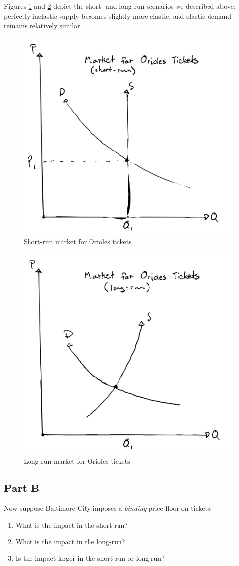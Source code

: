 \documentclass[12pt]{article}
\begin{document}
\vspace{2mm}

Figures \ref{fig:Orioles_short} and \ref{fig:Orioles_long} depict the short- and long-run scenarios we described above: perfectly inelastic supply becomes slightly more elastic, and elastic demand remains relatively similar.

\begin{figure}
    \centering
    \includegraphics[width=.6\textwidth]{Orioles_short.png}
    \caption{Short-run market for Orioles tickets}
    \label{fig:Orioles_short}
\end{figure}

\begin{figure}
    \centering
    \includegraphics[width=.6\textwidth]{Orioles_long.png}
    \caption{Long-run market for Orioles tickets}
    \label{fig:Orioles_long}
\end{figure}

\subsection*{Part B}
Now suppose Baltimore City imposes a \textit{binding} price floor on tickets:
    \begin{enumerate}
        \item What is the impact in the short-run?
        \item What is the impact in the long-run?
        \item Is the impact larger in the short-run or long-run?
    \end{enumerate}
\end{document}
